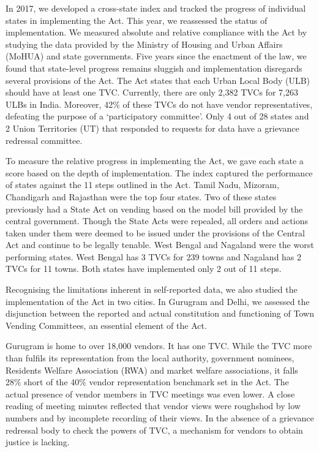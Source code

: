 \documentclass[a4paper, 12pt, twoside, table]{article}
\begin{document}
{In 2017, we developed a cross-state index and tracked the progress of individual states in implementing the Act. This year, we reassessed the status of implementation. We measured absolute and relative compliance with the Act by studying the data provided by the Ministry of Housing and Urban Affairs (MoHUA) and state governments. Five years since the enactment of the law, we found that state-level progress remains sluggish and implementation disregards several provisions of the Act. The Act states that each Urban Local Body (ULB) should have at least one TVC. Currently, there are only 2,382 TVCs for 7,263 ULBs in India. Moreover, 42\% of these TVCs do not have vendor representatives, defeating the purpose of a ‘participatory committee’. Only 4 out of 28 states and 2 Union Territories (UT) that responded to requests for data have a grievance redressal committee.

To measure the relative progress in implementing the Act, we gave each state a score based on the depth of implementation. The index captured the performance of states against the 11 steps outlined in the Act. Tamil Nadu, Mizoram, Chandigarh and Rajasthan were the top four states. Two of these states previously had a State Act on vending based on the model bill provided by the central government. Though the State Acts were repealed, all orders and actions taken under them were deemed to be issued under the provisions of the Central Act and continue to be legally tenable. West Bengal and Nagaland were the worst performing states. West Bengal has 3 TVCs for 239 towns and Nagaland has 2 TVCs for 11 towns. Both states have implemented only 2 out of 11 steps. %

Recognising the limitations inherent in self-reported data, we also studied the implementation of the Act in two cities. In Gurugram and Delhi, we assessed the disjunction between the reported and actual constitution and functioning of Town Vending Committees, an essential element of the Act. 

Gurugram is home to over 18,000 vendors. It has one TVC. While the TVC more than fulfils its representation from the local authority, government nominees, Residents Welfare Association (RWA) and market welfare associations, it falls 28\% short of the 40\% vendor representation benchmark set in the Act. The actual presence of vendor members in TVC meetings was even lower. A close reading of meeting minutes reflected that vendor views were roughshod by low numbers and by incomplete recording of their views. In the absence of a grievance redressal body to check the powers of TVC, a mechanism for vendors to obtain justice is lacking. 

}
\end{document}
